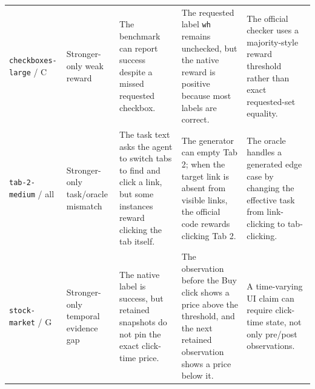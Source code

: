 \begin{longtable}{@{}>{\raggedright\arraybackslash}p{}p{}p{}p{}p{}@{}}
\texttt{checkboxes-large} / C & Stronger-only weak reward & The benchmark can report success despite a missed requested checkbox. & The requested label \texttt{wh} remains unchecked, but the native reward is positive because most labels are correct. & The official checker uses a majority-style reward threshold rather than exact requested-set equality. \\
\texttt{tab-2-medium} / all & Stronger-only task/oracle mismatch & The task text asks the agent to switch tabs to find and click a link, but some instances reward clicking the tab itself. & The generator can empty Tab 2; when the target link is absent from visible links, the official code rewards clicking Tab 2. & The oracle handles a generated edge case by changing the effective task from link-clicking to tab-clicking. \\
\texttt{stock-market} / G & Stronger-only temporal evidence gap & The native label is success, but retained snapshots do not pin the exact click-time price. & The observation before the Buy click shows a price above the threshold, and the next retained observation shows a price below it. & A time-varying UI claim can require click-time state, not only pre/post observations. \\
\bottomrule
\end{longtable}
\endgroup
